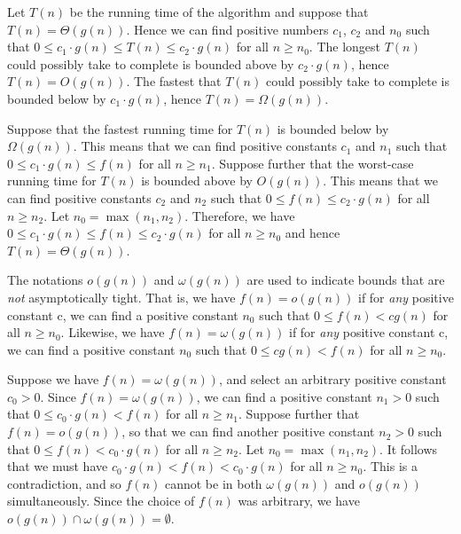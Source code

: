 \documentclass[a4paper,12pt]{article}
\begin{document}
Let $T(n)$ be the running time of the algorithm and suppose that $T(n) = \Theta(g(n))$. Hence we can find positive numbers $c_1$, $c_2$ and $n_0$ such that $0 \le c_1 \cdot g(n) \le T(n) \le c_2 \cdot g(n)$ for all $n \ge n_0$. The longest $T(n)$ could possibly take to complete is bounded above by $c_2 \cdot g(n)$, hence $T(n) = O(g(n))$. The fastest that $T(n)$ could possibly take to complete is bounded below by $c_1 \cdot g(n)$, hence $T(n) = \Omega(g(n))$.

Suppose that the fastest running time for $T(n)$ is bounded below by $\Omega(g(n))$. This means that we can find positive constants $c_1$ and $n_1$ such that $0 \le c_1\cdot g(n) \le f(n)$ for all $n \ge n_1$. Suppose further that the worst-case running time for $T(n)$ is bounded above by $O(g(n))$. This means that we can find positive constants $c_2$ and $n_2$ such that $0 \le f(n) \le c_2 \cdot g(n)$ for all $n \ge n_2$. Let $n_0 = \max(n_1, n_2)$. Therefore, we have $0 \le c_1 \cdot g(n) \le f(n) \le c_2 \cdot g(n)$ for all $n \ge n_0$ and hence $T(n) = \Theta(g(n))$.

\vspace{2mm}

The notations $o(g(n))$ and $\omega(g(n))$ are used to indicate bounds that are \textit{not} asymptotically tight. That is, we have $f(n) = o(g(n))$ if for \textit{any} positive constant c, we can find a positive constant $n_0$ such that $0 \le f(n) < cg(n)$ for all $n \ge n_0$. Likewise, we have $f(n) = \omega(g(n))$ if for \textit{any} positive constant c, we can find a positive constant $n_0$ such that $0 \le cg(n) < f(n)$ for all $n \ge n_0$.

Suppose we have $f(n) = \omega(g(n))$, and select an arbitrary positive constant $c_0 > 0$. Since $f(n) = \omega(g(n))$, we can find a positive constant $n_1 > 0$ such that $0 \le c_0\cdot g(n) < f(n)$ for all $n \ge n_1$. Suppose further that $f(n) = o(g(n))$, so that we can find another positive constant $n_2 > 0$ such that $0 \le f(n) < c_0 \cdot g(n)$ for all $n \ge n_2$. Let $n_0 = \max(n_1, n_2)$. It follows that we must have $c_0 \cdot g(n) < f(n) < c_0 \cdot g(n)$ for all $n \ge n_0$. This is a contradiction, and so $f(n)$ cannot be in both $\omega(g(n))$ and $o(g(n))$ simultaneously. Since the choice of $f(n)$ was arbitrary, we have $o(g(n)) \cap \omega(g(n)) = \emptyset$.
\end{document}
